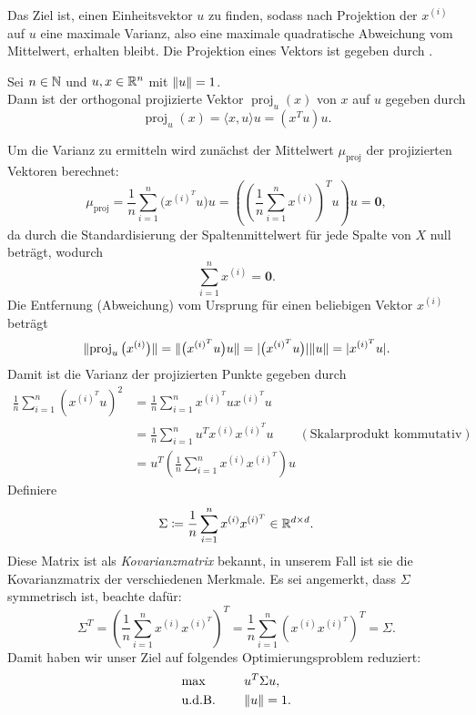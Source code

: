 Das Ziel ist, einen Einheitsvektor \(u\) zu finden, sodass nach Projektion der \(x^{(i)}\) auf \(u\) eine maximale Varianz, also eine maximale quadratische Abweichung vom Mittelwert, erhalten bleibt.
Die Projektion eines Vektors ist gegeben durch .
\begin{repitition}\label{rep:proj}
    Sei \(n \in \mathbb{N}\) und \(u,x \in \mathbb{R}^{n}\) mit \(\lVert u\rVert = 1\).  \\
    Dann ist der orthogonal projizierte Vektor \(\operatorname{proj}_{u}(x)\) von \(x\) auf \(u\) gegeben durch
    \begin{equation*}
        \operatorname{proj}_{u}(x) = \langle x,u \rangle u = (x^{T}u)u.
    \end{equation*}     
\end{repitition}
Um die Varianz zu ermitteln wird zunächst der Mittelwert \(\mu_{\operatorname{proj}}\) der projizierten Vektoren berechnet:
\begin{equation*}
    \mu_{\operatorname{proj}} = \frac{1}{n}\sum_{i=1}^{n}\big(x^{{(i)}^{T}}u\big)u = \left({\left(\frac{1}{n}\sum_{i=1}^{n}x^{(i)}\right)}^{T}u\right)u = \symbf{0},
\end{equation*}
da durch die Standardisierung der Spaltenmittelwert für jede Spalte von \(X\) null beträgt, wodurch
\begin{equation*}
    \sum_{i=1}^{n}x^{(i)} = \symbf{0}.
\end{equation*}
Die Entfernung (Abweichung) vom Ursprung für einen beliebigen Vektor \(x^{(i)}\) beträgt
\begin{equation*}
    \lVert\operatorname{proj}_{u}\big(x^{(i)}\big)\rVert = \lVert\big(x^{{(i)}^{T}}u\big)u\rVert =  \lvert\big(x^{{(i)}^{T}}u\big)\rvert\lVert u\rVert = \lvert x^{{(i)}^{T}}u\rvert.
\end{equation*}
Damit ist die Varianz der projizierten Punkte gegeben durch 
\begin{align*}
    \frac{1}{n}\sum_{i=1}^{n}{(x^{{(i)}^{T}}u)}^{2} &= \frac{1}{n}\sum_{i=1}^{n}x^{{(i)}^{T}}ux^{{(i)}^{T}}u \\
    &= \frac{1}{n}\sum_{i=1}^{n}u^{T}x^{(i)}x^{{(i)}^{T}}u \qquad (\text{Skalarprodukt kommutativ})\\
    &= u^{T}\left(\frac{1}{n}\sum_{i=1}^{n}x^{(i)}x^{{(i)}^{T}}\right)u
\end{align*}
Definiere 
\begin{equation*}
    \Sigma \coloneqq \frac{1}{n}\sum_{i=1}^{n}x^{(i)}x^{{(i)}^{T}} \in \mathbb{R}^{d \times d}.
\end{equation*}
Diese Matrix ist als \emph{Kovarianzmatrix} bekannt, in unserem Fall ist sie die Kovarianzmatrix der verschiedenen Merkmale.
Es sei angemerkt, dass \(\Sigma\) symmetrisch ist, beachte dafür:
\begin{equation*}
    \Sigma^{T} = {\left(\frac{1}{n}\sum_{i=1}^{n}x^{(i)}x^{{(i)}^{T}}\right)}^{T} = \frac{1}{n}\sum_{i=1}^{n}{\left(x^{(i)}x^{{(i)}^{T}}\right)}^{T} = \Sigma.
\end{equation*}
Damit haben wir unser Ziel auf folgendes Optimierungsproblem reduziert:
\begin{alignat*}{2}
    &\!\max \qquad &&u^{T} \Sigma u, \\
    &\text{u.d.B.}  &&\lVert u\rVert=1.
\end{alignat*}